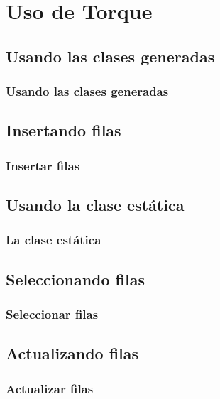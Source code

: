\documentclass[24pt, a4paper, oneside, spanish]{beamer}
\begin{document}
\section{Uso de Torque}
	\subsection{Usando las clases generadas}
	
	\begin{frame}[allowframebreaks]
	\frametitle{Usando las clases generadas}
	
	
	\end{frame}
	
	\subsection{Insertando filas}
	
	\begin{frame}
	\frametitle{Insertar filas}

	
	\end{frame}
		
	\subsection{Usando la clase estática}
	\begin{frame}
	\frametitle{La clase estática}
	
	
	\end{frame}
	
	\subsection{Seleccionando filas}
	\begin{frame}
	\frametitle{Seleccionar filas}
	
	
	\end{frame}
	
	\subsection{Actualizando filas}
	\begin{frame}
	\frametitle{Actualizar filas}
	
	
	\end{frame}
	
\end{document}
